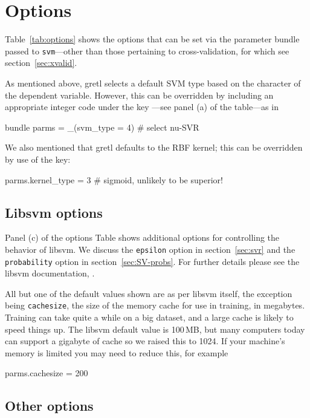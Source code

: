 \documentclass{article}
\begin{document}
\section{Options}
\label{sec:options}

Table~\ref{tab:options} shows the options that can be set via the
parameter bundle passed to \texttt{svm}---other than those pertaining
to cross-validation, for which see section~\ref{sec:xvalid}.

As mentioned above, gretl selects a default SVM type based on the
character of the dependent variable. However, this can be overridden
by including an appropriate integer code under the key
---see panel (a) of the table---as in
\begin{code}
bundle parms = _(svm_type = 4) # select nu-SVR
\end{code}
We also mentioned that gretl defaults to the RBF kernel; this can be
overridden by use of the  key:
\begin{code}
parms.kernel_type = 3 # sigmoid, unlikely to be superior!
\end{code}

\subsection{Libsvm options}
\label{sec:libsvm-options}

Panel (c) of the options Table shows additional options for
controlling the behavior of \textsf{libsvm}. We discuss the
\texttt{epsilon} option in section~\ref{sec:svr} and the
\texttt{probability} option in section~\ref{sec:SV-probs}. For further
details please see the \textsf{libsvm} documentation, \cite{HCL16}.

All but one of the default values shown are as per \textsf{libsvm}
itself, the exception being \texttt{cachesize}, the size of the memory
cache for use in training, in megabytes. Training can take quite a
while on a big dataset, and a large cache is likely to speed things
up. The \textsf{libsvm} default value is 100\,MB, but many computers
today can support a gigabyte of cache so we raised this to 1024. If
your machine's memory is limited you may need to reduce this, for
example
\begin{code}
parms.cachesize = 200
\end{code}

\subsection{Other options}
\label{sec:gretl-options}
\end{document}
